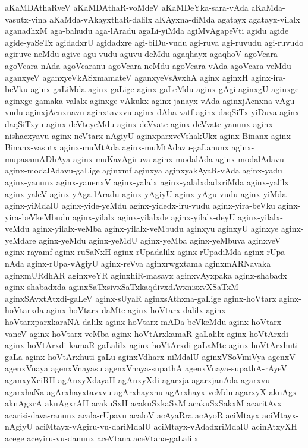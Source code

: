{aKaMDAthaRveV
aKaMDAthaR-voMdeV
aKaMDeYka-sara-vAda
aKaMda-vasutx-vina
aKaMda-vAkayxthaR-dalilx
aKAyxna-diMda
agatayx
agatayx-vilalx
aganadhxM
aga-bahudu
aga-lAradu
agaLi-yiMda
agiMvAgapeVti
agidu
agide
agide-yaSeTx
agidadxrU
agidadxre
agi-biDu-vudu
agi-ruva
agi-ruvudu
agi-ruvudo
agiruve-neMdu
agive
agu-vudu
aguvu-deMdu
agaqhayx
agaqhoV
agoVcara
agoVcara-nAda
agoVcaranu
agoVcara-neMdu
agoVcara-vAda
agoVcara-veMdu
aganxyeV
aganxyeVkASxmamateV
aganxyeVsAvxhA
aginx
aginxH
aginx-ira-beVku
aginx-gaLiMda
aginx-gaLige
aginx-gaLeMdu
aginx-gAgi
aginxgU
aginxge
aginxge-gamaka-valalx
aginxge-vAkukx
aginx-janayx-vAda
aginxjAcnxna-vAgu-vudu
aginxjAcnxnavu
aginxtavxvu
aginx-dAha-vatf
aginx-daqSiTx-yiDuva
aginx-daqSiTxyu
aginx-deVteyeMdu
aginx-deVvate
aginx-deVvate-yanunx
aginx-nishacxyavu
aginx-neVtarx-nAgiyU
aginxparxveVshakUkx
aginx-Binanx
aginx-Binanx-vasutx
aginx-muMtAda
aginx-muMtAdavu-gaLanunx
aginx-mupasamADhAya
aginx-muKavAgiruva
aginx-modalAda
aginx-modalAdavu
aginx-modalAdavu-gaLige
aginxmf
aginxya
aginxyakAyaR-vAda
aginx-yadu
aginx-yanunx
aginx-yanenxV
aginx-yalalx
aginx-yalalxdadxriMda
aginx-yalilx
aginx-yaleV
aginx-yAga-lAradu
aginx-yAgiyU
aginx-yAgu-vudu
aginx-yiMda
aginx-yiMdalU
aginx-yide-yeMdu
aginx-yidedx-iru-vudu
aginx-yira-beVku
aginx-yira-beVkeMbudu
aginx-yilalx
aginx-yilalxde
aginx-yilalx-deyU
aginx-yilalx-veMdu
aginx-yilalx-veMba
aginx-yilalx-veMbudu
aginxyu
aginxyU
aginxye
aginx-yeMdare
aginx-yeMdu
aginx-yeMdU
aginx-yeMba
aginx-yeMbuva
aginxyeV
aginx-rayamf
aginx-ruSaNxH
aginx-rUpadalilx
aginx-rUpadiMda
aginx-rUpa-nAda
aginx-rUpa-vAgiyU
aginx-reVva
aginxrwgxtama
aginxmARNavaka
aginxmURdhAR
aginxveYR
aginxhiR-masayx
aginxvAyxpaka
aginx-shabadx
aginx-shabadxda
aginxSaTxsivxSaTxkaqdivxdAvxnisxvXSaTxM
aginxSAvxtAtxdi-gaLeV
aginx-sUyaR
aginxsAthxna-gaLige
aginx-hoVtarx
aginx-hoVtarxda
aginx-hoVtarx-daMte
aginx-hoVtarx-dalilx
aginx-hoVtarxparxkaraNA-dalilx
aginx-hoVtarx-mADa-beVkeMdu
aginx-hoVtarx-vaneV
aginx-hoVtarx-veMba
aginx-hoVtArxkamaR-gaLalilx
aginx-hoVtArxdi
aginx-hoVtArxdi-kamaR-gaLalilx
aginx-hoVtArxdi-gaLaMte
aginx-hoVtArxhuti-gaLa
aginx-hoVtArxhuti-gaLu
aginxVdharx-niMdalU
aginxVSoVmiVya
agenxV
agenxVnaya
agenxVnayasu
agenxVnaya-supathA
agenxVnaya-supathA-rAyeV
aganxyXciRH
agAnxyXdayaH
agAnxyXdi
agarxja
agarxjanAda
agarxvu
agarxhaNa
agArxhayxtavxvu
agArxhayxnu
agArxhayx-veMdu
agarxyX
aknAgx
aknAgxrA
aknAgxrAH
acakuSxH
acakuSxkaSxM
acakuSxSakxM
acaritAvx
acarisi-dava-ranunx
acala-rUpavu
acaloV
acAyaRra
acAyoR
aciMtayx
aciMtayx-nAgiyU
aciMtayx-vAgiru-vu-dariMdalU
aciMtayx-vAdadxriMdalU
acinAtxyXH
acege
aceyiru-vu-danunx
aceVtana
aceVtana-gaLalilx
}
